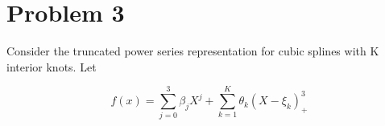 \section*{Problem 3}
Consider the truncated power series representation for cubic splines with K interior knots. Let

\[ 
	f(x) = \sum_{j = 0}^{3} \beta_j X^j  + \sum_{k = 1}^{K} \theta_k (X - \xi_k)_+^3
 \]